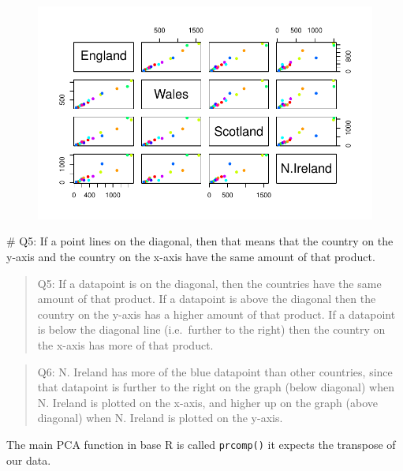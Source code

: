 \documentclass[
  letterpaper,
  DIV=11,
  numbers=noendperiod]{scrartcl}
\newenvironment{Shaded}{\begin{snugshade}}{\end{snugshade}}
\newcommand{\CommentTok}[1]{\textcolor[rgb]{0.37,0.37,0.37}{#1}}
\begin{document}
\begin{figure}[H]

{\centering \includegraphics{Lab-7_files/figure-pdf/unnamed-chunk-20-1.pdf}

}

\end{figure}

\begin{Shaded}
\begin{Highlighting}[]
\CommentTok{\# Q5: If a point lines on the diagonal, then that means that the country on the y{-}axis and the country on the x{-}axis have the same amount of that product. }
\end{Highlighting}
\end{Shaded}

\begin{quote}
Q5: If a datapoint is on the diagonal, then the countries have the same
amount of that product. If a datapoint is above the diagonal then the
country on the y-axis has a higher amount of that product. If a
datapoint is below the diagonal line (i.e.~further to the right) then
the country on the x-axis has more of that product.
\end{quote}

\begin{quote}
Q6: N. Ireland has more of the blue datapoint than other countries,
since that datapoint is further to the right on the graph (below
diagonal) when N. Ireland is plotted on the x-axis, and higher up on the
graph (above diagonal) when N. Ireland is plotted on the y-axis.
\end{quote}

The main PCA function in base R is called \texttt{prcomp()} it expects
the transpose of our data.
\end{document}
